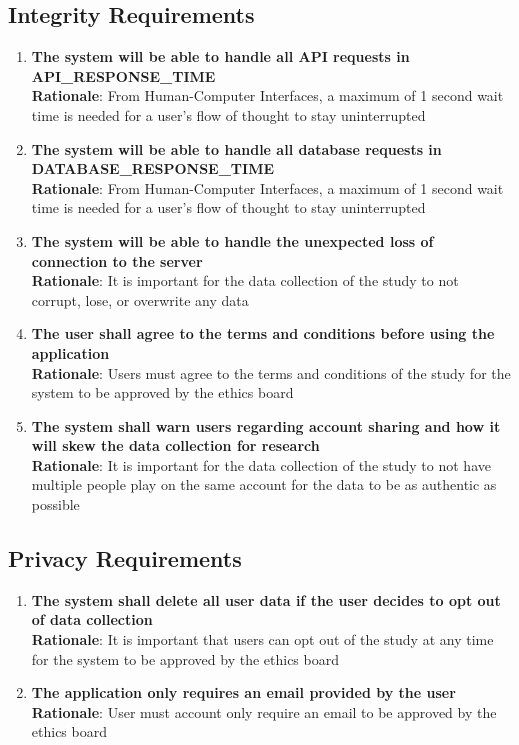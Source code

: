 \documentclass{article}
\begin{document}
\subsection{Integrity Requirements}
\begin{enumerate}[{IR}1. ]
    \item \textbf{The system will be able to handle all API requests in API\_RESPONSE\_TIME}\\
    \textbf{Rationale}: From Human-Computer Interfaces, a maximum of 1 second wait time is needed for a user's flow of thought to stay uninterrupted
    \item \textbf{The system will be able to handle all database requests in DATABASE\_RESPONSE\_TIME}\\
    \textbf{Rationale}: From Human-Computer Interfaces, a maximum of 1 second wait time is needed for a user's flow of thought to stay uninterrupted
    \item \textbf{The system will be able to handle the unexpected loss of connection to the server}\\
    \textbf{Rationale}: It is important for the data collection of the study to not corrupt, lose, or overwrite any data
    \item \textbf{The user shall agree to the terms and conditions before using the application }\\
    \textbf{Rationale}: Users must agree to the terms and conditions of the study for the system to be approved by the ethics board
    \item \textbf{The system shall warn users regarding account sharing and how it will skew the data collection for research}\\
    \textbf{Rationale}: It is important for the data collection of the study to not have multiple people play on the same account for the data to be as authentic as possible 
\end{enumerate}
\subsection{Privacy Requirements}
\begin{enumerate}[{PR}1.]
    \item \textbf{The system shall delete all user data if the user decides to opt out of data collection}\\
    \textbf{Rationale}: It is important that users can opt out of the study at any time for the system to be approved by the ethics board
    \item \textbf{The application only requires an email provided by the user}\\
    \textbf{Rationale}: User must account only require an email to be approved by the ethics board
\end{enumerate}
\end{document}

